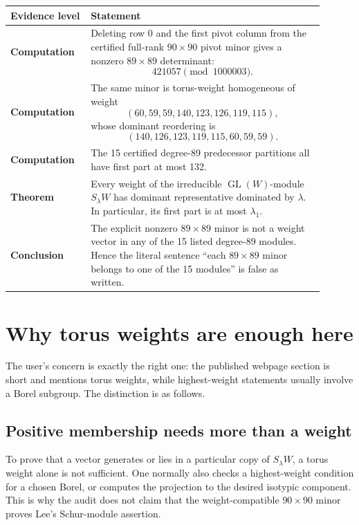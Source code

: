 \documentclass[11pt]{article}
\newcommand{\level}[1]{\textbf{\textsf{#1}}}
\newcommand{\GL}{\operatorname{GL}}
\begin{document}
\begin{center}
\begin{tabular}{p{0.22\linewidth}p{0.68\linewidth}}
\toprule
Evidence level & Statement \\
\midrule
\level{Computation} &
Deleting row 0 and the first pivot column from the certified full-rank
\(90\times90\) pivot minor gives a nonzero \(89\times89\) determinant:
\[
421057 \pmod {1000003}.
\]
\\
\level{Computation} &
The same minor is torus-weight homogeneous of weight
\[
(60,59,59,140,123,126,119,115),
\]
whose dominant reordering is
\[
(140,126,123,119,115,60,59,59).
\]
\\
\level{Computation} &
The 15 certified degree-89 predecessor partitions all have first part at most
132. \\
\level{Theorem} &
Every weight of the irreducible \(\GL(W)\)-module \(S_\lambda W\) has dominant
representative dominated by \(\lambda\).  In particular, its first part is at
most \(\lambda_1\). \\
\level{Conclusion} &
The explicit nonzero \(89\times89\) minor is not a weight vector in any of
the 15 listed degree-89 modules.  Hence the literal sentence ``each
\(89\times89\) minor belongs to one of the 15 modules'' is false as written. \\
\bottomrule
\end{tabular}
\end{center}

\section{Why torus weights are enough here}

The user's concern is exactly the right one: the published webpage section is
short and mentions torus weights, while highest-weight statements usually
involve a Borel subgroup.  The distinction is as follows.

\subsection{Positive membership needs more than a weight}

To prove that a vector generates or lies in a particular copy of
\(S_\lambda W\), a torus weight alone is not sufficient.  One normally also
checks a highest-weight condition for a chosen Borel, or computes the
projection to the desired isotypic component.  This is why the audit does not
claim that the weight-compatible \(90\times90\) minor proves Lee's
Schur-module assertion.
\end{document}

